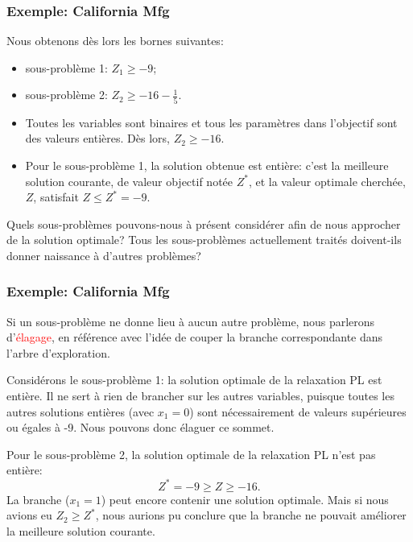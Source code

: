 \documentclass[usepdftitle=false, aspectratio=169]{beamer}
\begin{document}
\begin{frame}
\frametitle{Exemple: California Mfg}

Nous obtenons dès lors les bornes suivantes:
\begin{itemize}
\item
sous-problème 1: $Z_1 \geq -9$;
\item
sous-problème 2: $Z_2 \geq -16-\frac{1}{5}$.
\end{itemize}

\mbox{}

\begin{itemize}
	\item 
Toutes les variables sont binaires et tous les paramètres dans l'objectif sont des valeurs entières. Dès lors, $Z_2 \geq -16$.
\item 
Pour le sous-problème 1, la solution obtenue est entière: c'est la meilleure solution courante, de valeur objectif notée $Z^*$, et la valeur optimale cherchée, $Z$, satisfait $Z \leq Z^* = -9$.
\end{itemize}

\mbox{}

Quels sous-problèmes pouvons-nous à présent considérer afin de nous approcher de la solution optimale? Tous les sous-problèmes actuellement traités doivent-ils donner naissance à d'autres problèmes?

\end{frame}

\begin{frame}
\frametitle{Exemple: California Mfg}

Si un sous-problème ne donne lieu à aucun autre problème, nous parlerons d'\textcolor{red}{élagage}, en référence avec l'idée de couper la branche correspondante dans l'arbre d'exploration.

\mbox{}

Considérons le sous-problème 1: la solution optimale de la relaxation PL est entière.
Il ne sert à rien de brancher sur les autres variables, puisque toutes les autres solutions entières (avec $x_1 = 0$) sont nécessairement de valeurs supérieures ou égales à -9.
Nous pouvons donc élaguer ce sommet.

\mbox{}

Pour le sous-problème 2, la solution optimale de la relaxation PL n'est pas entière:
$$
Z^* = -9 \geq Z \geq -16.
$$
La branche ($x_1 = 1$) peut encore contenir une solution optimale.
Mais si nous avions eu $Z_2 \geq Z^*$, nous aurions pu conclure que la
branche ne pouvait améliorer la meilleure solution courante.

\end{frame}
\end{document}
